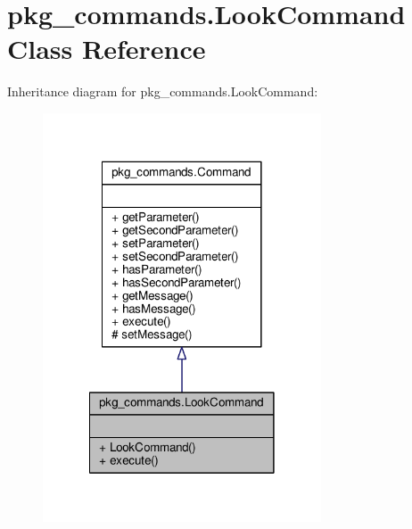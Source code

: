 \hypertarget{classpkg__commands_1_1LookCommand}{\section{pkg\-\_\-commands.\-Look\-Command Class Reference}
\label{classpkg__commands_1_1LookCommand}
}


Inheritance diagram for pkg\-\_\-commands.\-Look\-Command\-:
\nopagebreak
\begin{figure}[H]
\begin{center}
\leavevmode
\includegraphics[width=234pt]{classpkg__commands_1_1LookCommand__inherit__graph}
\end{center}
\end{figure}


